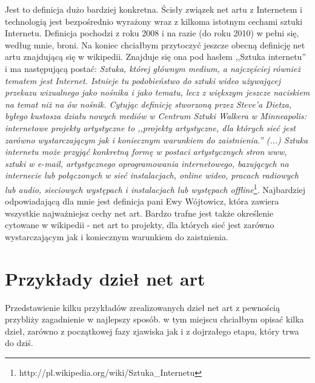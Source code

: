 \documentclass[a4paper,12pt,twoside]{article}
\begin{document}
Jest to definicja dużo bardziej konkretna. Ścisły związek net artu
z Internetem i technologią jest bezpośrednio wyrażony wraz z kilkoma
istotnym cechami sztuki Internetu. Definicja pochodzi z roku 2008
i na razie (do roku 2010) w pełni się, według mnie, broni.
Na koniec chciałbym przytoczyć jeszcze obecną definicję net artu znajdującą
się w wikipedii. Znajduje się ona pod hasłem ,,Sztuka internetu'' i ma
następującą postać: %
\textit{Sztuka, której głównym
medium, a najczęściej również tematem jest Internet. Istnieje tu podobieństwo
do sztuki wideo używającej przekazu wizualnego jako nośnika i jako tematu,
lecz z większym jeszcze naciskiem na temat niż na ów nośnik. Cytując definicję
stworzoną przez Steve'a Dietza, byłego kustosza działu nowych mediów
w Centrum Sztuki Walkera w Minneapolis: internetowe projekty artystyczne
to ,,projekty artystyczne, dla których sieć jest zarówno wystarczającym
jak i koniecznym warunkiem do zaistnienia.'' (...) Sztuka internetu może
przyjąć konkretną formę w postaci artystycznych stron www, sztuki w e-mail,
artystycznego oprogramowania internetowego, bazujących na internecie lub
połączonych w sieć instalacjach, online wideo, pracach radiowych lub audio,
sieciowych występach i instalacjach lub występach
offline}\footnote{http://pl.wikipedia.org/wiki/Sztuka\_Internetu}.
Najbardziej odpowiadającą dla mnie jest definicja pani Ewy Wójtowicz,
która zawiera wszystkie najważniejsz cechy net art. Bardzo trafne jest
także określenie cytowane w wikipedii - net art to projekty, dla których
sieć jest zarówno wystarczającym jak i koniecznym warunkiem do zaistnienia.

\section{Przykłady dzieł net art}

Przedstawienie kilku przykładów zrealizowanych dzieł net art z pewnością
przybliży zagadnienie w najlepszy sposób. w tym miejscu chciałbym
opisać kilka dzieł, zarówno z początkowej fazy zjawiska jak i z dojrzałego
etapu, który trwa do dziś.
\end{document}
